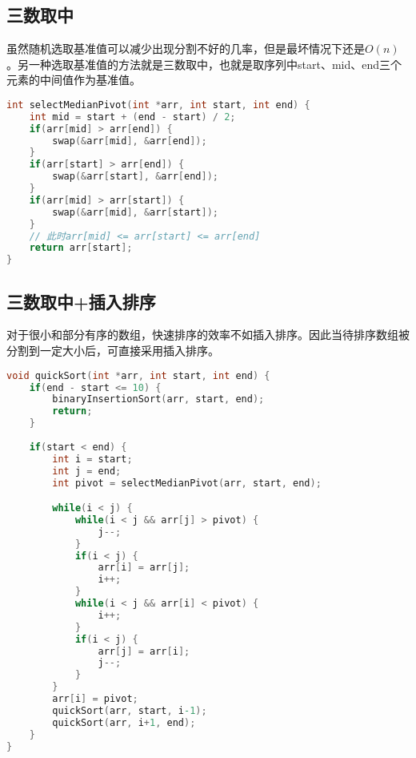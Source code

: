 \subsection{三数取中}

虽然随机选取基准值可以减少出现分割不好的几率，但是最坏情况下还是$ O(n) $。另一种选取基准值的方法就是三数取中，也就是取序列中start、mid、end三个元素的中间值作为基准值。\\


\begin{lstlisting}[language=C]
int selectMedianPivot(int *arr, int start, int end) {
    int mid = start + (end - start) / 2;
    if(arr[mid] > arr[end]) {
        swap(&arr[mid], &arr[end]);
    }
    if(arr[start] > arr[end]) {
        swap(&arr[start], &arr[end]);
    }
    if(arr[mid] > arr[start]) {
        swap(&arr[mid], &arr[start]);
    }
    // 此时arr[mid] <= arr[start] <= arr[end]
    return arr[start];
}
\end{lstlisting}

\vspace{0.5cm}

\subsection{三数取中+插入排序}

对于很小和部分有序的数组，快速排序的效率不如插入排序。因此当待排序数组被分割到一定大小后，可直接采用插入排序。\\


\begin{lstlisting}[language=C]
void quickSort(int *arr, int start, int end) {
    if(end - start <= 10) {
        binaryInsertionSort(arr, start, end);
        return;
    }
    
    if(start < end) {
        int i = start;
        int j = end;
        int pivot = selectMedianPivot(arr, start, end);

        while(i < j) {
            while(i < j && arr[j] > pivot) {
                j--;
            }
            if(i < j) {
                arr[i] = arr[j];
                i++;
            }
            while(i < j && arr[i] < pivot) {
                i++;
            }
            if(i < j) {
                arr[j] = arr[i];
                j--;
            }
        }
        arr[i] = pivot;
        quickSort(arr, start, i-1);
        quickSort(arr, i+1, end);
    } 
}
\end{lstlisting}

